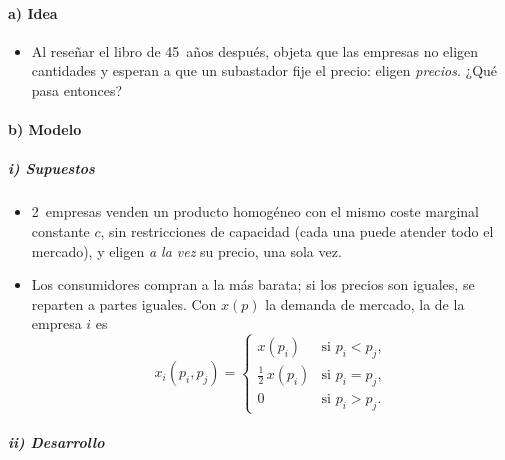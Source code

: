 \documentclass[11pt]{article}
\begin{document}
\paragraph{a) Idea}

\begin{itemize}
\item Al reseñar el libro de  45~años después, \textcite{Bertrand1883Theorie} objeta que las empresas no eligen cantidades y esperan a que un subastador fije el precio: eligen \emph{precios}. ¿Qué pasa entonces?
\end{itemize}

\paragraph{b) Modelo}

\subparagraph{i) Supuestos}

\begin{itemize}
\item 2~empresas venden un producto homogéneo con el mismo coste marginal constante $c$, sin restricciones de capacidad (cada una puede atender todo el mercado), y eligen \emph{a la vez} su precio, una sola vez.
\item Los consumidores compran a la más barata; si los precios son iguales, se reparten a partes iguales. Con $x(p)$ la demanda de mercado, la de la empresa $i$ es
  \[
  x_i(p_i,p_j)=\begin{cases}x(p_i) & \text{si } p_i<p_j,\\ \tfrac12\,x(p_i) & \text{si } p_i=p_j,\\ 0 & \text{si } p_i>p_j.\end{cases}
  \]
\end{itemize}

\subparagraph{ii) Desarrollo}
\end{document}

